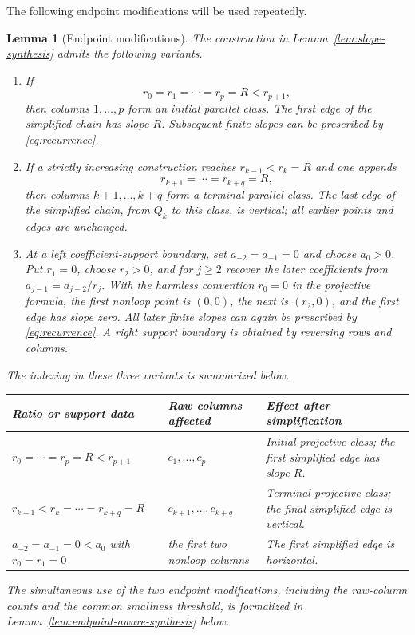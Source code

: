 \documentclass{amsart}
\numberwithin{equation}{section}
\newtheorem{lemma}[theorem]{Lemma}
\theoremstyle{definition}
\theoremstyle{remark}
\begin{document}
The following endpoint modifications will be used repeatedly.

\begin{lemma}[Endpoint modifications]\label{lem:endpoint-modifications}
The construction in Lemma~\ref{lem:slope-synthesis} admits the following variants.
\begin{enumerate}
\item If
\[
 r_0=r_1=\cdots=r_p=R<r_{p+1},
\]
then columns $1,\ldots,p$ form an initial parallel class.  The first edge of the simplified chain has slope $R$.  Subsequent finite slopes can be prescribed by \eqref{eq:recurrence}.
\item If a strictly increasing construction reaches $r_{k-1}<r_k=R$ and one appends
\[
 r_{k+1}=\cdots=r_{k+q}=R,
\]
then columns $k+1,\ldots,k+q$ form a terminal parallel class.  The last edge of the simplified chain, from $Q_k$ to this class, is vertical; all earlier points and edges are unchanged.
\item At a left coefficient-support boundary, set $a_{-2}=a_{-1}=0$ and choose $a_0>0$.  Put $r_1=0$, choose $r_2>0$, and for $j\ge2$ recover the later coefficients from $a_{j-1}=a_{j-2}/r_j$.  With the harmless convention $r_0=0$ in the projective formula, the first nonloop point is $(0,0)$, the next is $(r_2,0)$, and the first edge has slope zero.  All later finite slopes can again be prescribed by \eqref{eq:recurrence}.  A right support boundary is obtained by reversing rows and columns.
\end{enumerate}
The indexing in these three variants is summarized below.
\begin{center}
\small
\renewcommand{\arraystretch}{1.18}
\begin{tabularx}{\textwidth}{@{}>{\raggedright\arraybackslash}X>{\raggedright\arraybackslash}p{}>{\raggedright\arraybackslash}X@{}}
\toprule
Ratio or support data & Raw columns affected & Effect after simplification \\
\midrule
$r_0=\cdots=r_p=R<r_{p+1}$
& $c_1,\ldots,c_p$
& Initial projective class; the first simplified edge has slope $R$. \\
$r_{k-1}<r_k=\cdots=r_{k+q}=R$
& $c_{k+1},\ldots,c_{k+q}$
& Terminal projective class; the final simplified edge is vertical. \\
$a_{-2}=a_{-1}=0<a_0$ with $r_0=r_1=0$
& the first two nonloop columns
& The first simplified edge is horizontal. \\
\bottomrule
\end{tabularx}
\end{center}
The simultaneous use of the two endpoint modifications, including the raw-column counts and the common smallness threshold, is formalized in Lemma~\ref{lem:endpoint-aware-synthesis} below.
\end{lemma}
\end{document}
